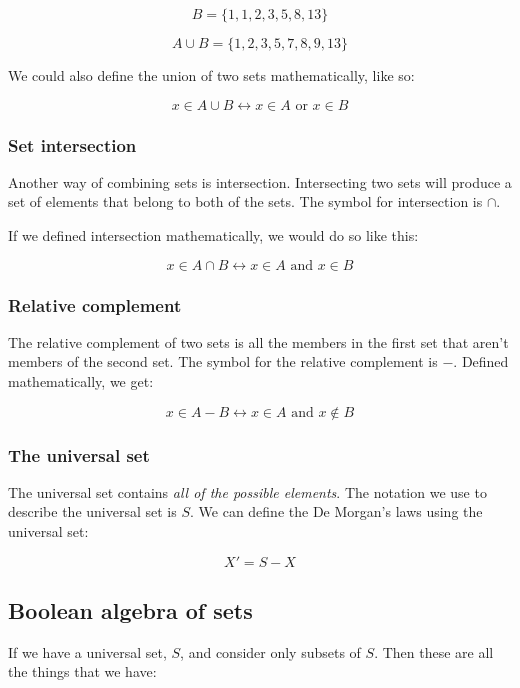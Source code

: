 \documentclass{article}
\begin{document}
\[
 	B = \{1, 1, 2, 3, 5, 8, 13\}
\]

\[
	A \cup B = \{1, 2, 3, 5, 7, 8, 9, 13\}
\]

We could also define the union of two sets mathematically, like so:

\[
	x \in A \cup B \leftrightarrow x \in A \textrm{ or } x \in B
\]

\subsubsection{Set intersection}

Another way of combining sets is intersection. Intersecting two sets will
produce a set of elements that belong to both of the sets. The symbol for
intersection is $\cap$.

If we defined intersection mathematically, we would do so like this:

\[
	x \in A \cap B \leftrightarrow x \in A \textrm{ and } x \in B
\]

\subsubsection{Relative complement}

The relative complement of two sets is all the members in the first set that
aren't members of the second set. The symbol for the relative complement is $-$.
Defined mathematically, we get:

\[
	x \in A - B \leftrightarrow x \in A \textrm{ and } x \not\in B
\]

\subsubsection{The universal set}
\label{subsubsec:universal_set}

The universal set contains {\it all of the possible elements}. The notation we use to describe the universal set is $S$. We can define the De Morgan's laws using the universal set:

\[
	X' = S - X
\]

\subsection{Boolean algebra of sets}

If we have a universal set, $S$, and consider only subsets of $S$. Then these
are all the things that we have:
\end{document}
